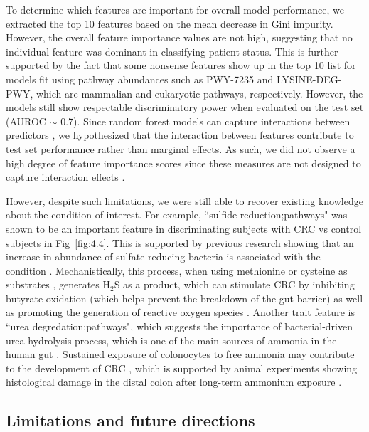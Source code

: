 To determine which features are important for overall model performance, we extracted the top 10 features based on the mean decrease in Gini impurity. However, the overall feature importance values are not high, suggesting that no individual feature was dominant in classifying patient status. This is further supported by the fact that some nonsense features show up in the top 10 list for models fit using pathway abundances such as PWY-7235 and LYSINE-DEG-PWY, which are mammalian and eukaryotic pathways, respectively. However, the models still show respectable discriminatory power when evaluated on the test set (AUROC $\sim$ 0.7). Since random forest models can capture interactions between predictors \cite{hastie2009elements}, we hypothesized that the interaction between features contribute to test set performance rather than marginal effects. As such, we did not observe a high degree of feature importance scores since these measures are not designed to capture interaction effects \cite{wright2016little}. 

However, despite such limitations, we were still able to recover existing knowledge about the condition of interest. For example, ``sulfide reduction;pathways" was shown to be an important feature in discriminating subjects with CRC vs control subjects in Fig~\ref{fig:4.4}. This is supported by previous research showing that an increase in abundance of sulfate reducing bacteria is associated with the condition \cite{yachida2019metagenomic}. Mechanistically, this process, when using methionine or cysteine as substrates \cite{cheng2020intestinal}, generates H$_2$S as a product, which can stimulate CRC by inhibiting butyrate oxidation (which helps prevent the breakdown of the gut barrier) as well as promoting the generation of reactive oxygen species \cite{marquet2009lactate}. Another trait feature is ``urea degredation;pathways", which suggests the importance of bacterial-driven urea hydrolysis process, which is one of the main sources of ammonia in the human gut \cite{blachier2007effects}. Sustained exposure of colonocytes to free ammonia may contribute to the development of CRC \cite{clausen1992fecal}, which is supported by animal experiments showing histological damage in the distal colon after long-term ammonium exposure \cite{lin1991colon}.      
\subsection*{Limitations and future directions}

